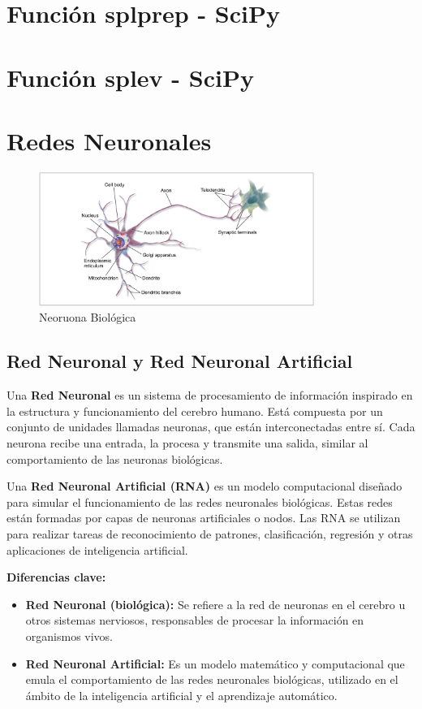 \documentclass[12pt]{article}
\begin{document}
\section{Función splprep - SciPy}
  
\section{Función splev - SciPy}
  


\section{Redes Neuronales}
  \begin{figure}[ht]
    \centering
    \includegraphics[width=0.8\textwidth]{./Imagenes/NeuronaBiologica.png}
    \caption{Neoruona Biológica}
    \label{fig:segunda}
  \end{figure}
  
  \subsection{Red Neuronal y Red Neuronal Artificial}
  Una \textbf{Red Neuronal} es un sistema de procesamiento de información inspirado en la estructura y 
  funcionamiento del cerebro humano. Está compuesta por un conjunto de unidades llamadas neuronas, 
  que están interconectadas entre sí. Cada neurona recibe una entrada, la procesa y transmite una 
  salida, similar al comportamiento de las neuronas biológicas.\par
  \medskip \noindent
  Una \textbf{Red Neuronal Artificial (RNA)} es un modelo computacional diseñado para simular el funcionamiento 
  de las redes neuronales biológicas. Estas redes están formadas por capas de neuronas artificiales o nodos. 
  Las RNA se utilizan para realizar tareas de reconocimiento de patrones, clasificación, regresión y otras aplicaciones 
  de inteligencia artificial.\par
  \medskip
  \textbf{Diferencias clave:}
  \begin{itemize}
    \item \textbf{Red Neuronal (biológica):} Se refiere a la red de neuronas en el cerebro u otros sistemas nerviosos, responsables de 
    procesar la información en organismos vivos.
    \item \textbf{Red Neuronal Artificial:} Es un modelo matemático y computacional que emula el comportamiento de las redes 
    neuronales biológicas, utilizado en el ámbito de la inteligencia artificial y el aprendizaje automático.
  \end{itemize}
\end{document}

